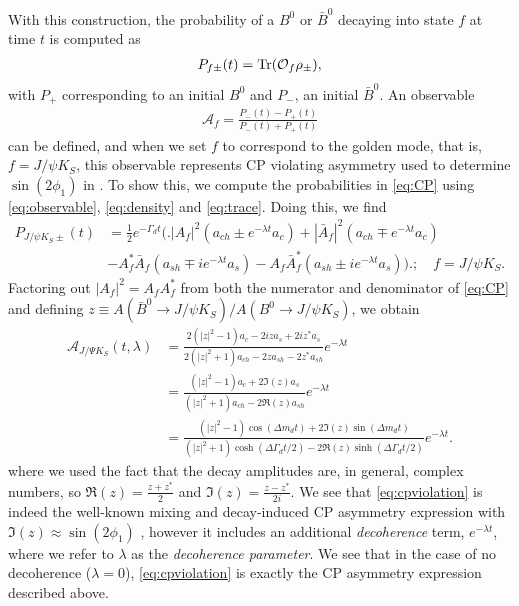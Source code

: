 With this construction, the probability of a $B^0$ or $\bar{B}^0$ decaying into state $f$ at time $t$ is computed as
\begin{align}
\label{eq:trace}
P_{f\pm}(t) = \Tr(\mathcal{O}_f\mathcal{\rho_\pm}),
\end{align}
with $P_+$ corresponding to an initial $B^0$ and $P_-$, an initial $\bar{B}^0$. An observable
\begin{align}
\label{eq:CP}
\mathcal{A}_f =\frac{P_-(t)-P_+(t)}{P_-(t)+P_+(t)}
\end{align}
can be defined, and when we set $f$ to correspond to the golden mode, that is, $f = J/\psi K_S$, this observable represents CP violating asymmetry used to determine $\sin(2\phi_1)$ in \cite{Abe1}. To show this, we compute the probabilities in \ref{eq:CP} using \ref{eq:observable}, \ref{eq:density} and \ref{eq:trace}. Doing this, we find
\begin{align}
\label{eq:probs}
P_{J/\psi K_S\pm}(t) &= \frac{1}{2}e^{-\Gamma_d t}\Bigg( \Bigg.|A_f|^2(a_{ch}\pm e^{-\lambda t}a_c)+|\bar{A}_f|^2(a_{ch}\mp e^{-\lambda t}a_c) \nonumber\\  &-A_f^*\bar{A}_f(a_{sh}\mp ie^{-\lambda t}a_s) - A_f\bar{A}_f^*(a_{sh}\pm ie^{-\lambda t}a_s)\Bigg) \Bigg. ;\quad f=J/\psi K_S.
\end{align}
Factoring out $|A_f|^2=A_fA_f^*$ from both the numerator and denominator of \ref{eq:CP} and defining $z\equiv A(\bar{B}^0\rightarrow J/\psi K_S)/A(B^0\rightarrow J/\psi K_S)$, we obtain
\begin{align}
\label{eq:cpviolation}
\mathcal{A}_{J/\Psi K_S}(t,\lambda)&=\frac{2(|z|^2-1)a_c - 2iz a_s + 2iz^*a_s}{2(|z|^2+1)a_{ch} -2z a_{sh} -2z^*a_{sh}}e^{-\lambda t}\nonumber\\
&=\frac{(|z|^2-1)a_c + 2\Im(z)a_s}{(|z|^2+1)a_{ch} -2\Re(z) a_{sh}}e^{-\lambda t}\nonumber\\
&=\frac{(|z|^2-1)\cos(\Delta m_d t) + 2\Im(z)\sin(\Delta m_d t)}{(|z|^2+1)\cosh(\Delta \Gamma_d t/2) -2\Re(z) \sinh(\Delta\Gamma_d t/2)}e^{-\lambda t}.
\end{align}
where we used the fact that the decay amplitudes are, in general, complex numbers, so $\Re(z)=\frac{z+z^*}{2}$ and $\Im(z) = \frac{z-z^*}{2i}$. We see that \ref{eq:cpviolation} is indeed the well-known mixing and decay-induced CP asymmetry expression with $\Im(z)\approx \sin(2\phi_1)$ \cite{Abe1,Abe2}, however it includes an additional \textit{decoherence} term, $e^{-\lambda t}$, where we refer to $\lambda$ as the \textit{decoherence parameter}. We see that in the case of no decoherence ($\lambda = 0$), \ref{eq:cpviolation} is exactly the CP asymmetry expression described above.


